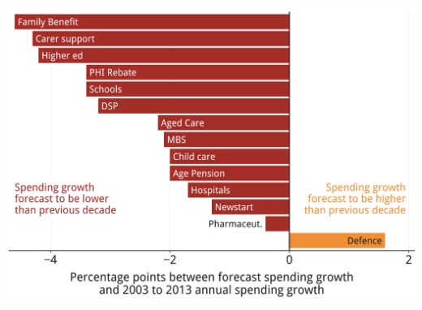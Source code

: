 \documentclass[tikz]{standalone}\usepackage[]{graphicx}\usepackage[]{color}
\newenvironment{knitrout}{}{} %
\begin{document}
\begin{knitrout}
\color{fgcolor}
\includegraphics[width=11.000in,height=8in]{./b5-figure/FISCAL-Figure8-altered-1} 

\end{knitrout}
\end{document}
